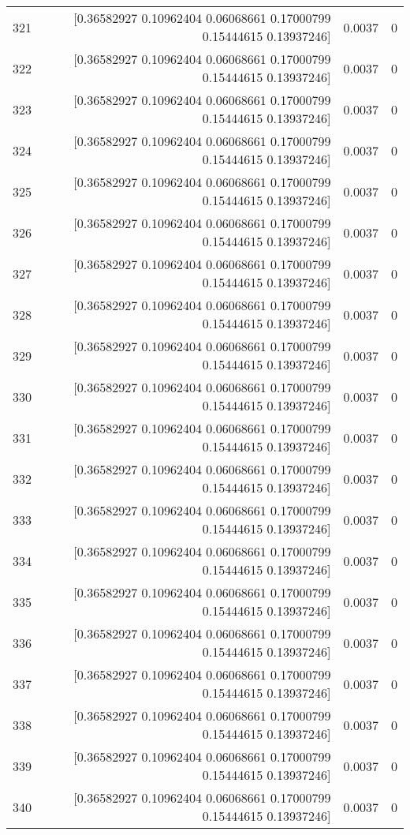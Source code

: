 \begin{longtable}{lrrr}
321 & [0.36582927 0.10962404 0.06068661 0.17000799 0.15444615 0.13937246] & 0.0037 & 0 \\
322 & [0.36582927 0.10962404 0.06068661 0.17000799 0.15444615 0.13937246] & 0.0037 & 0 \\
323 & [0.36582927 0.10962404 0.06068661 0.17000799 0.15444615 0.13937246] & 0.0037 & 0 \\
324 & [0.36582927 0.10962404 0.06068661 0.17000799 0.15444615 0.13937246] & 0.0037 & 0 \\
325 & [0.36582927 0.10962404 0.06068661 0.17000799 0.15444615 0.13937246] & 0.0037 & 0 \\
326 & [0.36582927 0.10962404 0.06068661 0.17000799 0.15444615 0.13937246] & 0.0037 & 0 \\
327 & [0.36582927 0.10962404 0.06068661 0.17000799 0.15444615 0.13937246] & 0.0037 & 0 \\
328 & [0.36582927 0.10962404 0.06068661 0.17000799 0.15444615 0.13937246] & 0.0037 & 0 \\
329 & [0.36582927 0.10962404 0.06068661 0.17000799 0.15444615 0.13937246] & 0.0037 & 0 \\
330 & [0.36582927 0.10962404 0.06068661 0.17000799 0.15444615 0.13937246] & 0.0037 & 0 \\
331 & [0.36582927 0.10962404 0.06068661 0.17000799 0.15444615 0.13937246] & 0.0037 & 0 \\
332 & [0.36582927 0.10962404 0.06068661 0.17000799 0.15444615 0.13937246] & 0.0037 & 0 \\
333 & [0.36582927 0.10962404 0.06068661 0.17000799 0.15444615 0.13937246] & 0.0037 & 0 \\
334 & [0.36582927 0.10962404 0.06068661 0.17000799 0.15444615 0.13937246] & 0.0037 & 0 \\
335 & [0.36582927 0.10962404 0.06068661 0.17000799 0.15444615 0.13937246] & 0.0037 & 0 \\
336 & [0.36582927 0.10962404 0.06068661 0.17000799 0.15444615 0.13937246] & 0.0037 & 0 \\
337 & [0.36582927 0.10962404 0.06068661 0.17000799 0.15444615 0.13937246] & 0.0037 & 0 \\
338 & [0.36582927 0.10962404 0.06068661 0.17000799 0.15444615 0.13937246] & 0.0037 & 0 \\
339 & [0.36582927 0.10962404 0.06068661 0.17000799 0.15444615 0.13937246] & 0.0037 & 0 \\
340 & [0.36582927 0.10962404 0.06068661 0.17000799 0.15444615 0.13937246] & 0.0037 & 0 \\

\end{longtable}
